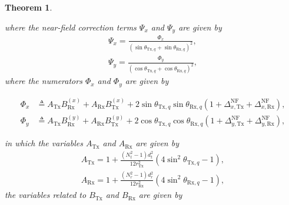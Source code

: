\documentclass[9pt,final,journal,twocolumn]{IEEEtran}
\newtheorem{theorem}{Theorem}
\begin{document}
\begin{theorem}
\begin{small}
\end{small}
\noindent\hspace{-1em} where the near-field correction terms $\Psi_{x}$ and $\Psi_{y}$ are given by
\begin{subequations} \label{correct_term_v}
\begin{align}
\Psi_x  \!=\!\frac{\Phi_x}{\left(\sin\theta_{\mathrm{Tx},q}+\sin\theta_{\mathrm{Rx},q}\right)^2}, \label{correct_term_vx}\\
\Psi_y  \!=\!\frac{\Phi_y}{\left(\cos\theta_{\mathrm{Tx},q}+\cos\theta_{\mathrm{Rx},q}\right)^2}, \label{correct_term_vy}
\end{align}
\end{subequations}
where the numerators $\Phi_x$  and $\Phi_y$ are given by 
\begin{small}
\begin{subequations} \label{correct_sub_term_v}
\begin{align}
\Phi_x &\!\triangleq\! A_{\mathrm{Tx}} B_{\mathrm{Rx}}^{(x)} \!+\! A_{\mathrm{Rx}} B_{\mathrm{Tx}}^{(x)}
\!+\! 2\sin\theta_{\mathrm{Tx},q}\sin\theta_{\mathrm{Rx},q}
\left(1\!+\!\Delta_{x,\mathrm{Tx}}^{\mathrm{NF}}\!+\!\Delta_{x,\mathrm{Rx}}^{\mathrm{NF}}\right), \label{correct_sub_term_vx}\\
\Phi_y &\!\triangleq\! A_{\mathrm{Tx}} B_{\mathrm{Rx}}^{(y)} \!+\! A_{\mathrm{Rx}} B_{\mathrm{Tx}}^{(y)}
\!+\! 2\cos\theta_{\mathrm{Tx},q}\cos\theta_{\mathrm{Rx},q}
\left(1\!+\!\Delta_{y,\mathrm{Tx}}^{\mathrm{NF}}\!+\!\Delta_{y,\mathrm{Rx}}^{\mathrm{NF}}\right), \label{correct_sub_term_vy}
\end{align}
\end{subequations}
\end{small}
in which the variables $A_{\mathrm{Tx}}$ and  $A_{\mathrm{Rx}}$ are given by
\begin{subequations}
\begin{align}
A_{\mathrm{Tx}} = 1 + \frac{\left(N_t^{2}-1\right)d_t^{2}}{12r_{\mathrm{Tx}}^{2}}
\left(4\sin^{2}\theta_{\mathrm{Tx},q}-1\right),\\
A_{\mathrm{Rx}} = 1 + \frac{\left(N_r^{2}-1\right)d_r^{2}}{12r_{\mathrm{Rx}}^{2}}
\left(4\sin^{2}\theta_{\mathrm{Rx},q}-1\right),
\end{align}
\end{subequations}
the variables related to $B_{\mathrm{Tx}}$ and $B_{\mathrm{Rx}}$ are given by
\begin{small}
\begin{subequations}
\begin{align}

\end{align}
\end{subequations}
\end{small}
\end{theorem}
\end{document}
